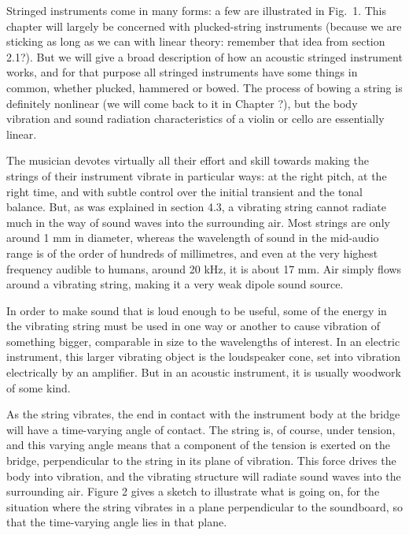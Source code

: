 
  Stringed instruments come in many forms: a few are illustrated in Fig.\ 1. 
  This chapter will largely be concerned with plucked-string instruments 
  (because we are sticking as long as we can with linear theory: remember that 
  idea from section 2.1?). But we will give a broad description of how an 
  acoustic stringed instrument works, and for that purpose all stringed 
  instruments have some things in common, whether plucked, hammered or bowed. 
  The process of bowing a string is definitely nonlinear (we will come back to 
  it in Chapter ?), but the body vibration and sound radiation characteristics 
  of a violin or cello are essentially linear. 

  The musician devotes virtually all their effort and skill towards making the 
  strings of their instrument vibrate in particular ways: at the right pitch, 
  at the right time, and with subtle control over the initial transient and the 
  tonal balance. But, as was explained in section 4.3, a vibrating string 
  cannot radiate much in the way of sound waves into the surrounding air. Most 
  strings are only around 1 mm in diameter, whereas the wavelength of sound in 
  the mid-audio range is of the order of hundreds of millimetres, and even at 
  the very highest frequency audible to humans, around 20 kHz, it is about 17 
  mm. Air simply flows around a vibrating string, making it a very weak dipole 
  sound source. 

  In order to make sound that is loud enough to be useful, some of the energy 
  in the vibrating string must be used in one way or another to cause vibration 
  of something bigger, comparable in size to the wavelengths of interest. In an 
  electric instrument, this larger vibrating object is the loudspeaker cone, 
  set into vibration electrically by an amplifier. But in an acoustic 
  instrument, it is usually woodwork of some kind. 

  As the string vibrates, the end in contact with the instrument body at the 
  bridge will have a time-varying angle of contact. The string is, of course, 
  under tension, and this varying angle means that a component of the tension 
  is exerted on the bridge, perpendicular to the string in its plane of 
  vibration. This force drives the body into vibration, and the vibrating 
  structure will radiate sound waves into the surrounding air. Figure 2 gives a 
  sketch to illustrate what is going on, for the situation where the string 
  vibrates in a plane perpendicular to the soundboard, so that the time-varying 
  angle lies in that plane. 

